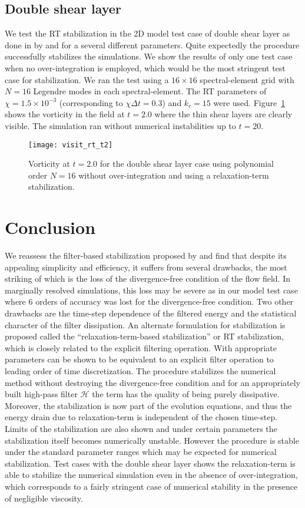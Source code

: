 \subsection{Double shear layer}
We test the RT stabilization in the 2D model test case of double shear layer as done in by \cite{fischer01} and \cite{malm13} for a several different parameters. Quite expectedly the procedure successfully stabilizes the simulations. We show the results of only one test case when no over-integration is employed, which would be the most stringent test case for stabilization. We ran the test using a $16\times16$ spectral-element grid with $N=16$ Legendre modes in each spectral-element. The RT parameters of $\chi=1.5\times10^{-3}$ (corresponding to $\chi\Delta t=0.3$) and $k_{c}=15$ were used. Figure~\ref{fig:rt_n15_t2} shows the vorticity in the field at $t=2.0$ where the thin shear layers are clearly visible. The simulation ran without numerical instabilities up to $t=20$.
\begin{figure}[h]
	\centering
	\texttt{[image: visit\_rt\_t2]}
	\caption{\small{Vorticity at $t=2.0$ for the double shear layer case using polynomial order $N=16$ without over-integration and using a relaxation-term stabilization.}}
	\label{fig:rt_n15_t2}
\end{figure}


\section{Conclusion}
We reassess the filter-based stabilization proposed by \cite{fischer01} and find that despite its appealing simplicity and efficiency, it suffers from several drawbacks, the most striking of which is the loss of the divergence-free condition of the flow field. In marginally resolved simulations, this loss may be severe as in our model test case where 6 orders of accuracy was lost for the divergence-free condition. Two other drawbacks are the time-step dependence of the filtered energy and the statistical character of the filter dissipation. An alternate formulation for stabilization is proposed called the ``relaxation-term-based stabilization'' or RT stabilization, which is closely related to the explicit filtering operation. With appropriate parameters can be shown to be equivalent to an explicit filter operation to leading order of time discretization. The procedure stabilizes the numerical method without destroying the divergence-free condition and for an appropriately built high-pass filter $\mathcal{H}$ the term has the quality of being purely dissipative. Moreover, the stabilization is now part of the evolution equations, and thus the energy drain due to relaxation-term is independent of the chosen time-step. Limits of the stabilization are also shown and under certain parameters the stabilization itself becomes numerically unstable. However the procedure is stable under the standard parameter ranges which may be expected for numerical stabilization. Test cases with the double shear layer shows the relaxation-term is able to stabilize the numerical simulation even in the absence of over-integration, which corresponds to a fairly stringent case of numerical stability in the presence of negligible viscosity.




%

%
